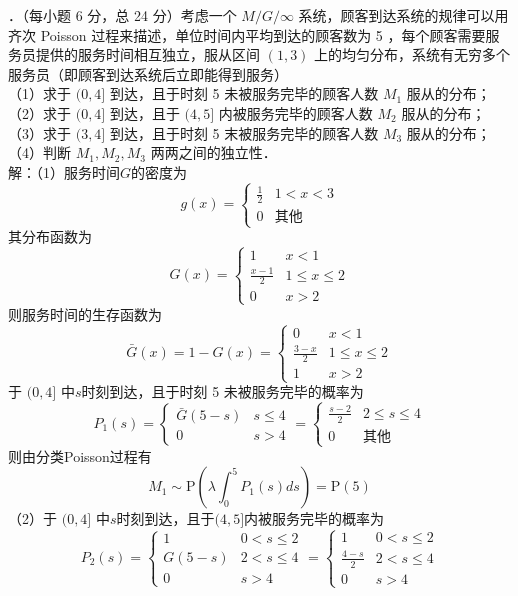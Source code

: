 \documentclass[UTF8,openany]{book}
\begin{document}
．（每小题 6 分，总 24 分）考虑一个 $M / G / \infty$ 系统，顾客到达系统的规律可以用齐次 Poisson 过程来描述，单位时间内平均到达的顾客数为 5 ，每个顾客需要服务员提供的服务时间相互独立，服从区间 $(1,3)$ 上的均匀分布，系统有无穷多个服务员（即顾客到达系统后立即能得到服务）\\
（1）求于 $(0,4]$ 到达，且于时刻 5 未被服务完毕的顾客人数 $M_{1}$ 服从的分布；\\
（2）求于 $(0,4]$ 到达，且于 $(4,5]$ 内被服务完毕的顾客人数 $M_{2}$ 服从的分布；\\
（3）求于 $(3,4]$ 到达，且于时刻 5 末被服务完毕的顾客人数 $M_{3}$ 服从的分布；\\
（4）判断 $M_{1}, M_{2}, M_{3}$ 两两之间的独立性．\\
解：（1）服务时间$G$的密度为
\[
g(x)=
\begin{cases}
	\frac{1}{2}  &  1<x<3 \\
	0  &  \text{其他}
\end{cases}
\]
其分布函数为
\[
G(x)=
\begin{cases}
	1  &  x<1 \\
	\frac{x-1}{2}  &  1\le x\le 2\\
	0  &  x>2 
\end{cases}
\]
则服务时间的生存函数为
\[
\bar{G}(x)=1-G(x)=
\begin{cases}
	0  &  x<1 \\
	\frac{3-x}{2}  &  1\le x\le 2\\
	1  &  x>2 
\end{cases}
\]
于 $(0,4]$ 中$s$时刻到达，且于时刻 5 未被服务完毕的概率为
\[
P_1(s)=
\begin{cases}
	\bar{G}(5-s) &  s\le 4 \\
	0  &  s > 4
\end{cases}
=
\begin{cases}
	\frac{s-2}{2} & 2\le s\le 4 \\
	0  &  \text{其他}
\end{cases}
\]
则由分类Poisson过程有
\[
M_1 \sim \mathrm{P}\left(\lambda \int_{0}^{5} P_1(s)ds  \right) =\mathrm{P}(5)
\]
（2）于 $(0,4]$ 中$s$时刻到达，且于$(4,5]$内被服务完毕的概率为
\[
P_2(s)=
\begin{cases}
	1  &  0<s\le 2 \\
	G(5-s)  &  2<s\le 4\\
	0 & s>4
\end{cases}
=
\begin{cases}
	1  &  0<s\le 2 \\
	\frac{4-s}{2}  &  2<s\le 4\\
	0 & s>4
\end{cases}
\]
\end{document}

